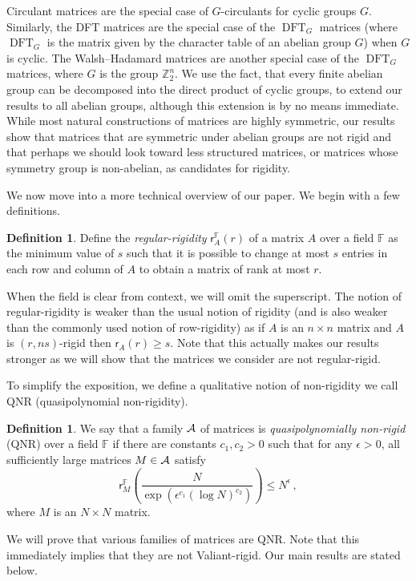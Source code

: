 \documentclass[11pt]{article}
\numberwithin{equation}{section}
\theoremstyle{definition}
\newtheorem{definition}[theorem]{Definition}
\theoremstyle{plain}
\newcommand{\Z}{\mathbb Z}
\theoremstyle{definition}
\newtheorem{define}[theorem]{Definition}
\newcommand\F{{\mathbb{F}}}
\renewcommand\Z{{\mathbb{Z}}}
\newcommand{\eps}{\epsilon}
\DeclareMathOperator{\DFT}{DFT}
\begin{document}
%
%

%
%
%
%
%
%
%
Circulant matrices are the special case of
$G$-circulants
%
%
%
for cyclic groups $G$.  Similarly, the DFT matrices 
are the special case of the $\DFT_G$ matrices %
(where $\DFT_G$ is the matrix given by the character table 
of an abelian group $G$) when
%
$G$ is cyclic.
The Walsh--Hadamard matrices are another special case of
the $\DFT_G$ matrices, where $G$ is the group $\Z_2^n$.  %
%
%
%
We use the fact, that 
every finite abelian group can be decomposed into 
the direct product of cyclic groups, 
to extend our results to all abelian groups, although this
extension is by no means immediate.  
While most natural constructions of matrices are highly symmetric,
our results %
%
show  %
that matrices that are  symmetric under abelian groups are not rigid and that perhaps we should look toward less structured matrices, or matrices whose symmetry group is non-abelian, as candidates for rigidity.   

We now move into a more technical overview of our paper. %
We begin with a few definitions. 
\begin{definition}
Define the \emph{regular-rigidity} 
%
%
$\textsf{r}^{\F}_A(r)$  
of a matrix $A$ over a field $\F$  %
as the minimum value of $s$ such that it is possible to change at most $s$ 
entries in each row and column of $A$ to obtain a matrix of rank at most $r$.
\end{definition}
%
%
When the field is clear from context, we will omit the superscript.%
The notion of regular-rigidity is weaker than the usual notion of rigidity (and is also weaker than the commonly used notion of row-rigidity) as if $A$ is an $n \times n$ matrix and $A$ is $(r,ns)$-rigid then $\textsf{r}_A(r) \geq s$.  Note that this actually makes our results stronger as we will show that the matrices we consider are not regular-rigid.


%
To simplify the exposition, we define a
%
%
%
%
qualitative notion  %
of non-rigidity we call QNR (quasipolynomial non-rigidity).
\begin{define}
We say that
a family $\cal A$ of matrices %
is \emph{quasipolynomially non-rigid} (QNR)  %
over a field $\F$ if there are constants $c_1,c_2 > 0$ such that for
any $\eps > 0$, all sufficiently large matrices $M \in \cal A$ satisfy
%
%
%
%
\[
\textsf{r}^{\F}_M\left( \frac{N}{\exp\left(\eps^{c_1}(\log N)^{c_2}\right)}
 \right) \leq N^{\eps} \,,
\]
where $M$ is an $N \times N$ matrix.
\end{define}  
We will prove that various families of matrices are QNR.
Note that this immediately implies that they are not Valiant-rigid.  Our main results are stated below.
%
%
\end{document}
